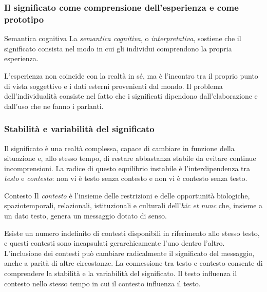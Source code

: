 \documentclass[a4paper]{article}
\begin{document}
\subsubsection{Il significato come comprensione dell'esperienza e come prototipo}
\begin{snippetdefinition}{Semantica cognitiva}
    La \emph{semantica cognitiva}, o \emph{interpretativa}, sostiene che il significato consista nel modo in cui gli individui comprendono la propria esperienza.
\end{snippetdefinition}
L'esperienza non coincide con la realtà in sé, ma è l'incontro tra il proprio punto di vista soggettivo e i dati esterni provenienti dal mondo.
Il problema dell'individualità consiste nel fatto che i significati dipendono dall'elaborazione e dall'uso che ne fanno i parlanti.
\subsubsection{Stabilità e variabilità del significato}
Il significato è una realtà complessa, capace di cambiare in funzione della situazione e, allo stesso tempo, di restare abbastanza stabile da evitare continue incomprensioni.
La radice di questo equilibrio instabile è l'interdipendenza tra \emph{testo} e \emph{contesto}: non vi è testo senza contesto e non vi è contesto senza testo.
\begin{snippetdefinition}{Contesto}
    Il \emph{contesto} è l'insieme delle restrizioni e delle opportunità biologiche, spaziotemporali, relazionali, istituzionali e culturali dell'\emph{hic et nunc} che, insieme a un dato testo, genera un messaggio dotato di senso.
\end{snippetdefinition}
Esiste un numero indefinito di contesti disponibili in riferimento allo stesso testo, e questi contesti sono incapsulati gerarchicamente l'uno dentro l'altro. L'inclusione dei contesti può cambiare radicalmente il significato del messaggio, anche a parità di altre circostanze.
La connessione tra testo e contesto consente di comprendere la stabilità e la variabilità del significato. Il testo influenza il contesto nello stesso tempo in cui il contesto influenza il testo.
\end{document}
